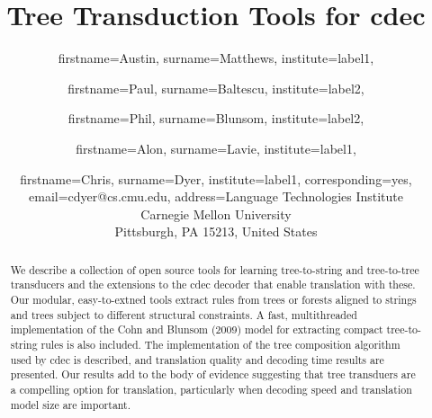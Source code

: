\documentclass[nofonts]{pbml} %
\begin{document}
\title{Tree Transduction Tools for cdec}


\author{
  firstname=Austin,
  surname=Matthews,
  institute=label1,
}
\author{
  firstname=Paul,
  surname=Baltescu,
  institute=label2,
}
\author{
  firstname=Phil,
  surname=Blunsom,
  institute=label2,
}
\author{
  firstname=Alon,
  surname=Lavie,
  institute=label1,
}
\author{
  firstname=Chris,
  surname=Dyer,
  institute=label1,
  corresponding=yes,
  email={cdyer@cs.cmu.edu},
  address={Language Technologies Institute\\Carnegie Mellon University\\Pittsburgh, PA 15213, United States}
}

\PBMLmaketitle

\begin{abstract}
We describe a collection of open source tools for learning
tree-to-string and tree-to-tree transducers and the extensions to the
cdec decoder that enable translation with these. Our modular,
easy-to-extned tools extract rules from trees or forests aligned to
strings and trees subject to different structural constraints. A fast,
multithreaded implementation of the Cohn and Blunsom (2009) model for
extracting compact tree-to-string rules is also included. The
implementation of the tree composition algorithm used by cdec is
described, and translation quality and decoding time results are
presented. Our results add to the body of evidence suggesting that
tree transduers are a compelling option for translation, particularly
when decoding speed and translation model size are important.
\end{abstract}

\end{document}
